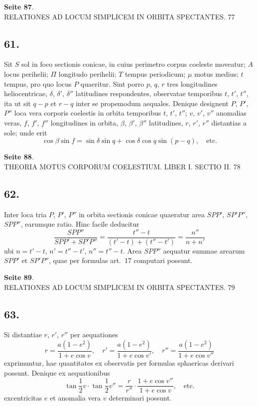 \documentclass[12pt,a4paper]{article}
\begin{document}
\textbf{Seite 87}.\\
RELATIONES AD LOCUM SIMPLICEM IN ORBITA SPECTANTES. 77

\subsection*{61.}

Sit $S$ sol in foco sectionis conicae, in cuius perimetro corpus coeleste moveatur; $A$ locus perihelii; $\Pi$ longitudo perihelii; $T$ tempus periodicum; $\mu$ motus medius; $t$ tempus, pro quo locus $P$ quaeritur. Sint porro $p$, $q$, $r$ tres longitudines heliocentricae, $\delta$, $\delta'$, $\delta''$ latitudines respondentes, observatae temporibus $t$, $t'$, $t''$, ita ut sit $q - p$ et $r - q$ inter se propemodum aequales. Denique designent $P$, $P'$, $P''$ loca vera corporis coelestis in orbita temporibus $t$, $t'$, $t''$; $v$, $v'$, $v''$ anomalias veras, $f$, $f'$, $f''$ longitudines in orbita, $\beta$, $\beta'$, $\beta''$ latitudines, $r$, $r'$, $r''$ distantias a sole; unde erit
\[
\cos \beta \sin f = \sin \delta \sin q + \cos \delta \cos q \sin(p - q), \quad\text{etc.}
\]

\textbf{Seite 88}.\\
THEORIA MOTUS CORPORUM COELESTIUM. LIBER I. SECTIO II. 78

\subsection*{62.}

Inter loca tria $P$, $P'$, $P''$ in orbita sectionis conicae quaeratur area $SPP'$, $SP'P''$, $SPP''$, earumque ratio. Hinc facile deducitur
\[
\frac{SPP''}{SPP' + SP'P''} = \frac{t'' - t}{(t' - t) + (t'' - t')} = \frac{n''}{n + n'}
\]
ubi $n = t' - t$, $n' = t'' - t'$, $n'' = t'' - t$. Area $SPP''$ aequatur summae arearum $SPP'$ et $SP'P''$, quae per formulas art.~17 computari possunt.

\textbf{Seite 89}.\\
RELATIONES AD LOCUM SIMPLICEM IN ORBITA SPECTANTES. 79

\subsection*{63.}

Si distantiae $r$, $r'$, $r''$ per aequationes
\[
r = \frac{a(1-e^2)}{1+e \cos v}, \quad r' = \frac{a(1-e^2)}{1+e \cos v'}, \quad r'' = \frac{a(1-e^2)}{1+e \cos v''}
\]
exprimuntur, hae quantitates ex observatis per formulas sphaericas derivari possunt. Denique ex aequationibus
\[
\tan \frac{1}{2}v \cdot \tan \frac{1}{2}v'' = \frac{r}{r''} \cdot \frac{1+e \cos v''}{1+e \cos v}, \quad \text{etc.}
\]
excentricitas $e$ et anomalia vera $v$ determinari possunt.
\end{document}
